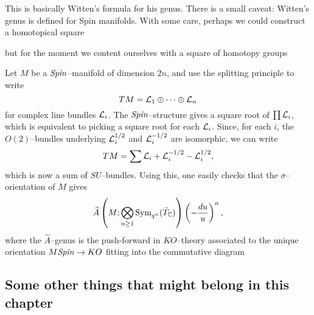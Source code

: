This is basically Witten's formula for his genus.  There is a small caveat: Witten's genus is defined for Spin manifolds.  With some care, perhaps we could construct a homotopical square
\begin{center}
\end{center}
but for the moment we content ourselves with a square of homotopy groups
\begin{center}
\end{center}
Let $M$ be a $\mathit{Spin}$--manifold of dimension $2n$, and use the splitting principle to write \[TM = \mathcal{L}_1 \oplus \cdots \oplus \mathcal{L}_n\] for complex line bundles $\mathcal{L}_i$.  The $\mathit{Spin}$--structure gives a square root of $\prod \mathcal{L}_i$, which is equivalent to picking a square root for each $\mathcal{L}_i$.  Since, for each $i$, the $O(2)$--bundles underlying $\mathcal{L}_i^{1/2}$ and $\mathcal{L}_i^{-1/2}$ are isomorphic, we can write \[TM = \sum \mathcal{L}_i + \mathcal{L}_i^{-1/2} - \mathcal{L}_i^{1/2},\] which is now a sum of $SU$--bundles.  Using this, one easily checks that the $\sigma$--orientation of $M$ gives \[\widehat A \left(M; \bigotimes_{n \ge 1} \operatorname{Sym}_{q^n}(\bar T_{\mathbb{C}}) \right) \left(-\frac{du}{u}\right)^n,\] where the $\widehat A$--genus is the push-forward in $KO$--theory associated to the unique orientation $M\mathit{Spin} \to KO$ fitting into the commutative diagram
\begin{center}
\end{center}






\subsection*{Some other things that might belong in this chapter}


